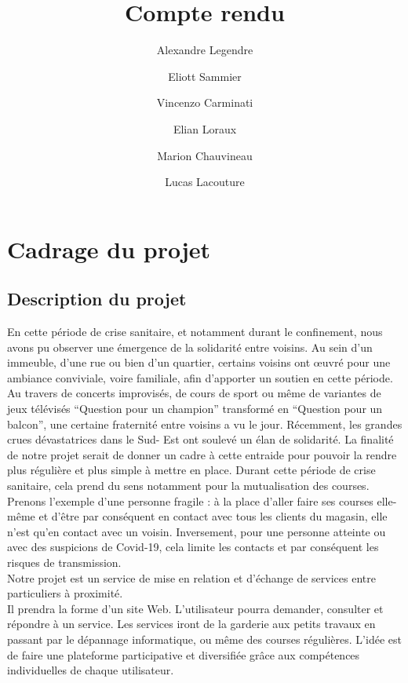 \documentclass[a4paper,11pt]{article}
\title{Compte rendu}
\author{
  Alexandre Legendre\\
  \and
  Eliott Sammier\\
  \and
  Vincenzo Carminati\\
  \and
  Elian Loraux\\
  \and
  Marion Chauvineau\\
  \and
  Lucas Lacouture\\
}
\begin{document}
\newpage
\tableofcontents
\newpage


\section{Cadrage du projet}


\subsection{Description du projet}
En cette période de crise sanitaire, et notamment durant le confinement, nous avons pu observer une
émergence de la solidarité entre voisins. Au sein d’un immeuble, d’une rue ou bien d’un quartier,
certains voisins ont œuvré pour une ambiance conviviale, voire familiale, afin d’apporter un soutien en
cette période. Au travers de concerts improvisés, de cours de sport ou même de variantes de jeux
télévisés “Question pour un champion” transformé en “Question pour un balcon”,
une certaine fraternité entre voisins a vu le jour. Récemment, les grandes crues dévastatrices dans le Sud-
Est ont soulevé un élan de solidarité. La finalité de notre projet serait de donner un cadre à cette
entraide pour pouvoir la rendre plus régulière et plus simple à mettre en place.
Durant cette période de crise sanitaire, cela prend du sens notamment pour la mutualisation des
courses. Prenons l’exemple d’une personne fragile : à la place d’aller faire ses courses elle-même et
d’être par conséquent en contact avec tous les clients du magasin, elle n’est qu’en contact avec un
voisin. Inversement, pour une personne atteinte ou avec des suspicions de Covid-19, cela limite les
contacts et par conséquent les risques de transmission.\\

Notre projet est un service de mise en relation et d’échange de services entre particuliers à proximité.\\

Il prendra la forme d’un site Web. L’utilisateur pourra demander, consulter et répondre à un service.
Les services iront de la garderie aux petits travaux en passant par le dépannage informatique, ou
même des courses régulières. L’idée est de faire une plateforme participative et diversifiée grâce aux
compétences individuelles de chaque utilisateur.\\
\end{document}
